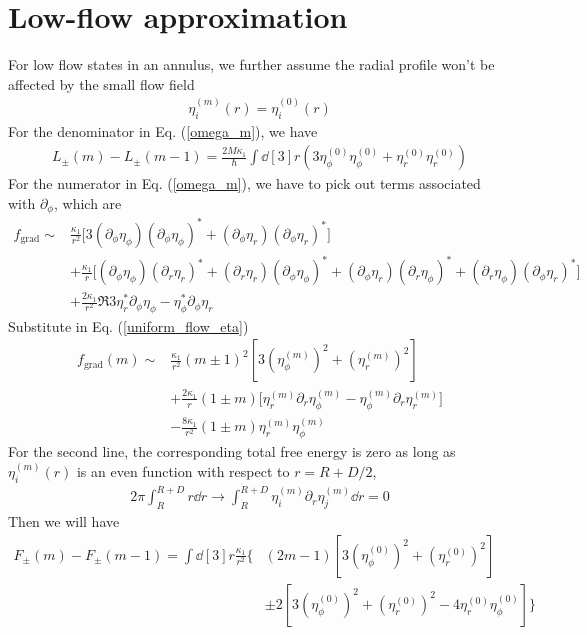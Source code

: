 \documentclass[aps,prl,preprint]{revtex4-2}
\begin{document}
\section{Low-flow approximation}
For low flow states in an annulus, we further assume the radial profile won't be affected by the small flow field
\begin{align}
    \eta^{(m)}_i(r) = \eta^{(0)}_i(r)
\end{align}
For the denominator in Eq. (\ref{omega_m}), we have
\begin{align}
    L_\pm(m) - L_\pm(m-1) = \frac{2M\kappa_1}{\hbar}\int\dd[3]r\left(3\eta_\phi^{(0)}\eta_\phi^{(0)}+\eta_r^{(0)}\eta_r^{(0)}\right)
\end{align}
For the numerator in Eq. (\ref{omega_m}), we have to pick out terms associated with $\partial_\phi$, which are
\begin{align}
    f_\text{grad}\sim
     & \frac{\kappa_1}{r^2}\bigg[3(\partial_\phi\eta_\phi)(\partial_\phi\eta_\phi)^*
    + (\partial_\phi\eta_r)(\partial_\phi\eta_r)^*\bigg]\nonumber                    \\
     & +\frac{\kappa_1}{r}\bigg[(\partial_\phi\eta_\phi)(\partial_r\eta_r)^*
        + (\partial_r\eta_r)(\partial_\phi\eta_\phi)^* + (\partial_\phi\eta_r)(\partial_r\eta_\phi)^*
    + (\partial_r\eta_\phi)(\partial_\phi\eta_r)^*\bigg]\nonumber                    \\
     & +\frac{2\kappa_1}{r^2}\Re{3\eta_r^*\partial_\phi\eta_\phi
        - \eta_\phi^*\partial_\phi\eta_r}
\end{align}
Substitute in Eq. (\ref{uniform_flow_eta})
\begin{align}
    f_\text{grad}(m)\sim & \frac{\kappa_1}{r^2}(m\pm 1)^2\left[3\left(\eta^{(m)}_\phi\right)^2 + \left(\eta^{(m)}_r\right)^2\right]\nonumber              \\
                         & +\frac{2\kappa_1}{r}(1\pm m)\bigg[\eta_r^{(m)}\partial_r\eta_\phi^{(m)} - \eta_\phi^{(m)}\partial_r\eta_r^{(m)}\bigg]\nonumber \\
                         & -\frac{8\kappa_1}{r^2}(1\pm m)\eta^{(m)}_r\eta^{(m)}_\phi
\end{align}
For the second line, the corresponding total free energy is zero as long as $\eta_i^{(m)}(r)$ is an even function with respect to $r=R+D/2$,
\begin{align}
    2\pi\int_R^{R+D} r\dd r\rightarrow\int_R^{R+D}\eta^{(m)}_i\partial_r\eta^{(m)}_j\dd r = 0
\end{align}
Then we will have
\begin{align}
    F_\pm(m) - F_\pm(m-1) = \int\dd[3]r\frac{\kappa_1}{r^2}\Bigg\{ & (2m-1)\left[3\left(\eta^{(0)}_\phi\right)^2 + \left(\eta^{(0)}_r\right)^2\right]\nonumber                           \\
                                                                   & \pm 2\left[3\left(\eta^{(0)}_\phi\right)^2 + \left(\eta^{(0)}_r\right)^2-4\eta^{(0)}_r\eta^{(0)}_\phi\right]\Bigg\}
\end{align}
\end{document}
